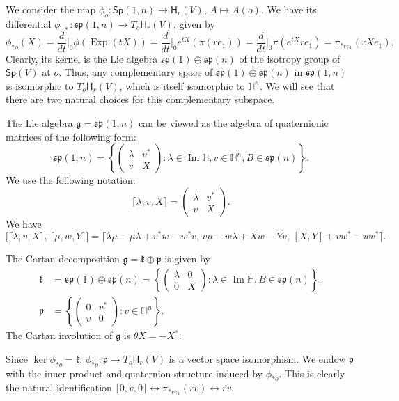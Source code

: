 \documentclass[12pt, a4paper,draft]{amsart}
\newcommand{\Exp}{\operatorname{Exp}}
\newcommand{\g}{\mathfrak}
\renewcommand{\H}{\mathbb{H}}
\renewcommand{\Im}{\operatorname{Im}}
\newcommand{\Sp}{\mathsf{Sp}}
\theoremstyle{remark}
\begin{document}
We consider the map $\phi_o\colon \Sp(1,n)\to\mathsf{H}_r(V)$, $A\mapsto A(o)$.
We have its differential $\phi_{o*}\colon\g{sp}(1,n)\to T_o\mathsf{H}_r(V)$, given by
\[
\phi_{*o}(X)
=\frac{d}{dt}\Big\vert_{0}\phi(\Exp(tX))
=\frac{d}{dt}\Big\vert_{0}e^{tX}(\pi(re_1))
=\frac{d}{dt}\Big\vert_{0}\pi(e^{tX}re_1)
=\pi_{*re_1}(rXe_1).
\]
Clearly, its kernel is the Lie algebra $\g{sp}(1)\oplus\g{sp}(n)$ of the isotropy group of $\Sp(V)$ at $o$.
Thus, any complementary space of $\g{sp}(1)\oplus\g{sp}(n)$ in $\g{sp}(1,n)$ is isomorphic to $T_o\mathsf{H}_r(V)$, which is itself isomorphic to $\H^n$.
We will see that there are two natural choices for this complementary subspace.

The Lie algebra $\g{g}=\g{sp}(1,n)$ can be viewed as the algebra of quaternionic matrices of the following form:
\[
\g{sp}(1,n)=\left\{
\left(
\begin{array}{c|c}
\lambda & v^{*} \\
\hline
v & X
\end{array}
\right):
\lambda \in \Im \H,v\in \H^{n}, B\in \g{sp}(n)
\right\}.
\]
We use the following notation: 
\[
\lceil \lambda, v, X\rceil =\left(
\begin{array}{c|c}
\lambda & v^{*} \\
\hline
v & X
\end{array}
\right).
\]
We have
\[
\bigl[\lceil \lambda,v,X \rceil,\, \lceil \mu,w,Y \rceil\bigr]
=\lceil \lambda\mu-\mu\lambda+v^{*}w-w^{*}v,\, v\mu-w\lambda+Xw-Yv,\, [X,Y]+vw^{*}-wv^{*} \rceil.
\]

The Cartan decomposition $\g{g}=\g{k}\oplus\g{p}$ is given by
\[
\begin{aligned}
\g{k}&
{}=\g{sp}(1)\oplus\g{sp}(n)
=\left\{
	\left(
	\begin{array}{c|c}
		\lambda & 0 \\
		\hline
		0 & X
	\end{array}
	\right):
	\lambda \in \Im \H, B\in \g{sp}(n)
\right\}, \\
\g{p}&
{}=\left\{
\left(
	\begin{array}{c|c}
		0 & v^{*} \\
		\hline
		v & 0
	\end{array}
\right):
v\in \H ^{n}
\right\}.
\end{aligned}
\]
The Cartan involution of $\g{g}$ is $\theta X = -X^{*}$.

Since $\ker\phi_{*o}=\g{k}$, $\phi_{*o}\colon\g{p}\to T_o\mathsf{H}_r(V)$ is a vector space isomorphism.
We endow $\g{p}$ with the inner product and quaternion structure induced by $\phi_{*o}$.
This is clearly the natural identification $\lceil 0,v,0\rceil \leftrightarrow \pi_{*re_1}(rv) \leftrightarrow rv$.
\end{document}
